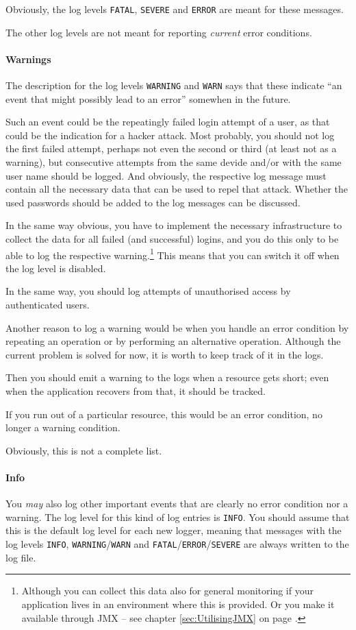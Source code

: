 \documentclass[11pt,a4paper, titlepage, parskip=half, headsepline, footsepline, cleardoublepage=current, headheight=1cm]{scrbook}
\newcommand*{\tqvref}[1]{\hyperref[{#1}]{\ref*{#1}} on page \pageref{#1}}
\begin{document}
Obviously, the log levels \verb#FATAL#, \verb#SEVERE# and \verb#ERROR# are meant for these messages.

The other log levels are not meant for reporting \textit{current} error conditions.

\paragraph{Warnings} The description for the log levels \verb#WARNING# and \verb#WARN# says that these indicate “an event that might possibly lead to an error” somewhen in the future.

Such an event could be the repeatingly failed login attempt of a user, as that could be the indication for a hacker attack. Most probably, you should not log the first failed attempt, perhaps not even the second or third (at least not as a warning), but consecutive attempts from the same devide and/or with the same user name should be logged. And obviously, the respective log message must contain all the necessary data that can be used to repel that attack. Whether the used passwords should be added to the log messages can be discussed.

In the same way obvious, you have to implement the necessary infrastructure to collect the data for all failed (and successful) logins, and you do this only to be able to log the respective warning.\footnote{Although you can collect this data also for general monitoring if your application lives in an environment where this is provided. Or you make it available through JMX – see chapter \tqvref{sec:UtilisingJMX}.} This means that you can switch it off when the log level is disabled.

In the same way, you should log attempts of unauthorised access by authenticated users.

Another reason to log a warning would be when you handle an error condition by repeating an operation or by performing an alternative operation. Although the current problem is solved for now, it is worth to keep track of it in the logs.

Then you should emit a warning to the logs when a resource gets short; even when the application recovers from that, it should be tracked.

If you run out of a particular resource, this would be an error condition, no longer a warning condition.

Obviously, this is not a complete list.

\paragraph{Info} You \textit{may} also log other important events that are clearly no error condition nor a warning. The log level for this kind of log entries is \verb#INFO#. You should assume that this is the default log level for each new logger, meaning that messages with the log levels \verb#INFO#, \verb#WARNING#/\verb#WARN# and \verb#FATAL#/\verb#ERROR#/\verb#SEVERE# are always written to the log file.
\end{document}

